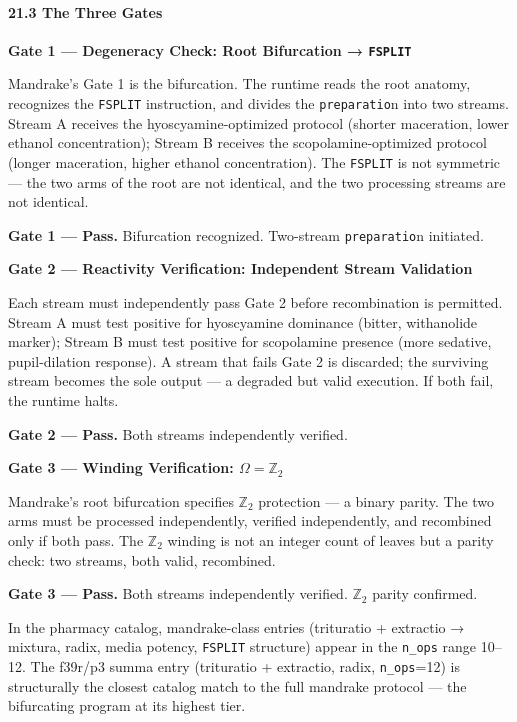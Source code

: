 \hypertarget{the-three-gates-1}{%
\paragraph{21.3 The Three Gates}\label{the-three-gates-1}}

\textbf{Gate 1 --- Degeneracy Check: Root Bifurcation → \texttt{FSPLIT}}

Mandrake's Gate 1 is the bifurcation. The runtime reads the root
anatomy, recognizes the \texttt{FSPLIT} instruction, and divides the
\texttt{preparatio}n into two streams. Stream A receives the
hyoscyamine-optimized protocol (shorter maceration, lower ethanol
concentration); Stream B receives the scopolamine-optimized protocol
(longer maceration, higher ethanol concentration). The \texttt{FSPLIT}
is not symmetric --- the two arms of the root are not identical, and the
two processing streams are not identical.

\textbf{Gate 1 --- Pass.} Bifurcation recognized. Two-stream
\texttt{preparatio}n initiated.

\textbf{Gate 2 --- Reactivity Verification: Independent Stream
Validation}

Each stream must independently pass Gate 2 before recombination is
permitted. Stream A must test positive for hyoscyamine dominance
(bitter, withanolide marker); Stream B must test positive for
scopolamine presence (more sedative, pupil-dilation response). A stream
that fails Gate 2 is discarded; the surviving stream becomes the sole
output --- a degraded but valid execution. If both fail, the runtime
halts.

\textbf{Gate 2 --- Pass.} Both streams independently verified.

\textbf{Gate 3 --- Winding Verification: \(\Omega = \mathbb{Z}_2\)}

Mandrake's root bifurcation specifies \(\mathbb{Z}_2\) protection --- a
binary parity. The two arms must be processed independently, verified
independently, and recombined only if both pass. The \(\mathbb{Z}_2\)
winding is not an integer count of leaves but a parity check: two
streams, both valid, recombined.

\textbf{Gate 3 --- Pass.} Both streams independently verified.
\(\mathbb{Z}_2\) parity confirmed.

In the pharmacy catalog, mandrake-class entries (trituratio + extractio
→ mixtura, radix, media potency, \texttt{FSPLIT} structure) appear in
the \texttt{n\_ops} range 10--12. The f39r/p3 summa entry (trituratio +
extractio, radix, \texttt{n\_ops}=12) is structurally the closest
catalog match to the full mandrake protocol --- the bifurcating program
at its highest tier.

